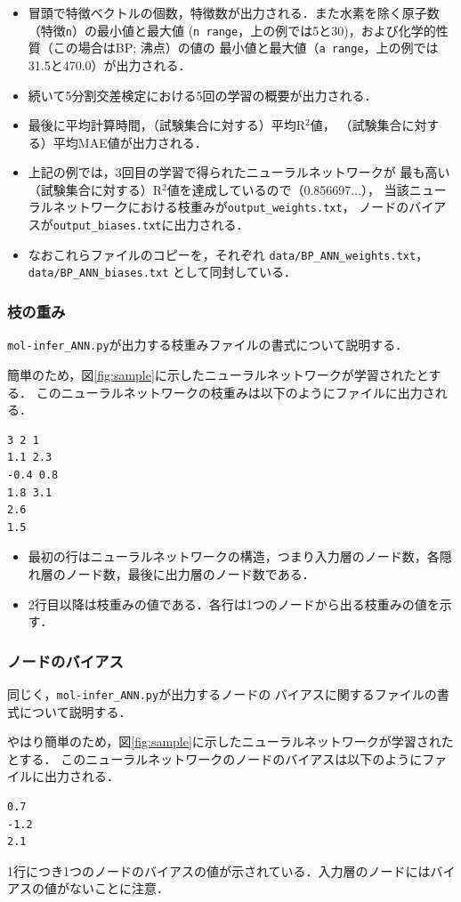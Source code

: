 \documentclass[11pt,dvipdfmx,twoside]{jarticle}
\newcommand{\figref}[1]{図\ref{fig:#1}}
\begin{document}
\begin{itemize}
\item  冒頭で特徴ベクトルの個数，特徴数が出力される．また水素を除く原子数（特徴\verb|n|）の最小値と最大値 (\verb|n range|，上の例では5と30)，および化学的性質（この場合はBP; 沸点）の値の
最小値と最大値（\verb|a range|，上の例では31.5と470.0）が出力される．
\item 続いて5分割交差検定における5回の学習の概要が出力される．
\item 最後に平均計算時間，（試験集合に対する）平均R$^2$値，
（試験集合に対する）平均MAE値が出力される．
\item 上記の例では，3回目の学習で得られたニューラルネットワークが
最も高い（試験集合に対する）R$^2$値を達成しているので（0.856697$\dots$），
当該ニューラルネットワークにおける枝重みが\verb|output_weights.txt|，
ノードのバイアスが\verb|output_biases.txt|に出力される．
\item なおこれらファイルのコピーを，それぞれ
\verb|data/BP_ANN_weights.txt|，\verb|data/BP_ANN_biases.txt|
として同封している．
\end{itemize}


\subsubsection{枝の重み}
\verb|mol-infer_ANN.py|が出力する枝重みファイルの書式について説明する．

簡単のため，\figref{sample}に示したニューラルネットワークが学習されたとする．
このニューラルネットワークの枝重みは以下のようにファイルに出力される．

\begin{oframed}
{\small
\begin{verbatim}
3 2 1
1.1 2.3
-0.4 0.8
1.8 3.1
2.6
1.5
\end{verbatim}
}
\end{oframed}
\begin{itemize}
\item 最初の行はニューラルネットワークの構造，つまり入力層のノード数，各隠れ層のノード数，最後に出力層のノード数である．
\item 2行目以降は枝重みの値である．各行は1つのノードから出る枝重みの値を示す．
\end{itemize}


\subsubsection{ノードのバイアス}
同じく，\verb|mol-infer_ANN.py|が出力するノードの
バイアスに関するファイルの書式について説明する．

やはり簡単のため，\figref{sample}に示したニューラルネットワークが学習されたとする．
このニューラルネットワークのノードのバイアスは以下のようにファイルに出力される．

\begin{oframed}
{\small
\begin{verbatim}
0.7
-1.2
2.1
\end{verbatim}
}
\end{oframed}
1行につき1つのノードのバイアスの値が示されている．入力層のノードにはバイアスの値がないことに注意．
\end{document}
